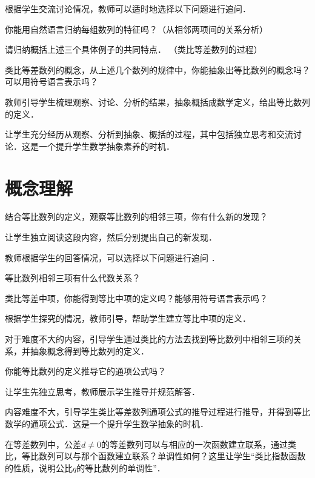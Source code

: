 根据学生交流讨论情况，教师可以适时地选择以下问题进行追问．

\reproblem
\begin{enumerateout}
    \item 你能用自然语言归纳每组数列的特征吗？（从相邻两项间的关系分析）
    \item 请归纳概括上述三个具体例子的共同特点． （类比等差数列的过程）
    \item 类比等差数列的概念，从上述几个数列的规律中，你能抽象出等比数列的概念吗？可以用符号语言表示吗？
\end{enumerateout}

\TSA 教师引导学生梳理观察、讨论、分析的结果，抽象概括成数学定义，给出等比数列的定义．

\DP 让学生充分经历从观察、分析到抽象、概括的过程，其中包括独立思考和交流讨论．这是一个提升学生数学抽象素养的时机．

\section{概念理解}
\begin{problem}
结合等比数列的定义，观察等比数列的相邻三项，你有什么新的发现？
\end{problem}
\TSA 让学生独立阅读这段内容，然后分别提出自己的新发现．

教师根据学生的回答情况，可以选择以下问题进行追问 ．

\reproblem
\begin{enumerateout}
    \item 等比数列相邻三项有什么代数关系？
    \item 类比等差中项，你能得到等比中项的定义吗？能够用符号语言表示吗？
\end{enumerateout}


\TSA 根据学生探究的情况，教师引导，帮助学生建立等比中项的定义．

\DP 对于难度不大的内容，引导学生通过类比的方法去找到等比数列中相邻三项的关系，并抽象概念得到等比数列的定义．
\begin{problem}\label{pblm:a}
你能等比数列的定义推导它的通项公式吗？
\end{problem}

\TSA 让学生先独立思考，教师展示学生推导并规范解答．

\DP 内容难度不大，引导学生类比等差数列通项公式的推导过程进行推导，并得到等比数学的通项公式．这是一个提升学生数学抽象的时机．
\begin{problem}
    在等差数列中，公差$d\neq 0$的等差数列可以与相应的一次函数建立联系，通过类比，等比数列可以与那个函数建立联系？单调性如何？这里让学生“类比指数函数的性质，说明公比$q$的等比数列的单调性”．
\end{problem}

